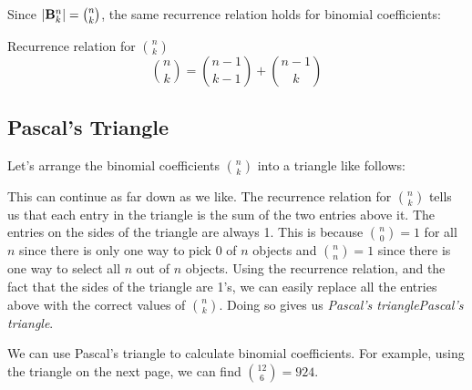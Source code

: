 \documentclass[12pt]{article}
\begin{document}
Since $|\mathbf{B}^n_k| = {n \choose k}$, the same recurrence relation holds for binomial coefficients:

\begin{defbox}{Recurrence relation for ${n \choose k}$}
  \[{n \choose k} = {n-1 \choose k-1} + {n-1 \choose k}\]
\end{defbox}

\subsection{Pascal's Triangle}

Let's arrange the binomial coefficients ${n \choose k}$ into a triangle like follows:

\begin{center}

\end{center}

This can continue as far down as we like.  The recurrence relation for ${n \choose k}$ tells us that each entry in the triangle is the sum of the two entries above it.  The entries on the sides of the triangle are always 1.  This is because ${n \choose 0} = 1$ for all $n$ since there is only one way to pick 0 of $n$ objects and ${n \choose n} = 1$ since there is one way to select all $n$ out of $n$ objects.  Using the recurrence relation, and the fact that the sides of the triangle are 1's, we can easily replace all the entries above with the correct values of ${n \choose k}$.  Doing so gives us \emph{Pascal's triangle}\emph{Pascal's triangle}.

We can use Pascal's triangle to calculate binomial coefficients.  For example, using the triangle on the next page, we can find ${12 \choose 6} = 924$.
\end{document}
